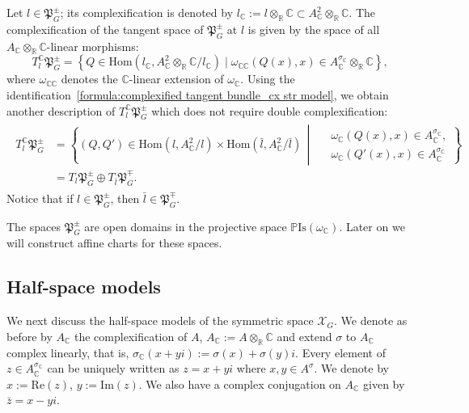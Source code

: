 \documentclass[oneside,11pt]{amsart}
\theoremstyle{definition}
\theoremstyle{remark}
\newcommand{\midwd}{\,\middle\vert\,}
\numberwithin{thm}{section}
\numberwithin{equation}{section}
\begin{document}
Let $l\in\mathfrak{P}_G^\pm$; its complexification is denoted by $l_\mathbb C:=l\otimes_\mathbb R\mathbb C\subset A_\mathbb C^2\otimes_\mathbb R \mathbb C$. The complexification of the tangent space of $\mathfrak P_G^\pm$ at $l$ is given by the space of all $A_\mathbb C\otimes_\mathbb R \mathbb C$-linear morphisms:
$$T_l^\mathbb C\mathfrak{P}_G^\pm=\left\{Q\in\mathrm{Hom}(l_\mathbb C,A_\mathbb C^2\otimes_\mathbb R\mathbb C/l_\mathbb C)\mid \omega_{\mathbb C\mathbb C}(Q(x),x)\in A^{\sigma_\mathbb C}_\mathbb C\otimes_\mathbb R\mathbb C\right\},$$
where $\omega_{\mathbb C\mathbb C}$ denotes the $\mathbb C$-linear extension of $\omega_\mathbb C$. Using the identification~\eqref{formula:complexified tangent bundle_cx str model}, we obtain another description of $T_l^\mathbb C\mathfrak{P}_G^\pm$ which does not require double complexification:
\begin{align}\label{eq:compl.tangent.P.Sp}
    \begin{aligned}
    T_l^\mathbb C\mathfrak{P}_G^\pm&=\left\{(Q,Q')\in\mathrm{Hom}(l,A_\mathbb C^2/l)\times \mathrm{Hom}(\bar l,A_\mathbb C^2/\bar l)\midwd
    \begin{aligned}
        &\ \omega_{\mathbb C}(Q(x),x)\in A^{\sigma_\mathbb C}_\mathbb C,\\
        &\ \omega_{\mathbb C}(Q'(x),x)\in A^{\sigma_\mathbb C}_\mathbb C
    \end{aligned}\right\}\\
    &=T_l\mathfrak{P}_G^\pm\oplus T_{\bar l}\mathfrak{P}_G^\mp. 
    \end{aligned}
\end{align}
Notice that if $l\in\mathfrak{P}_G^\pm$, then $\bar l\in\mathfrak{P}_G^\mp$.


The spaces $\mathfrak{P}_G^\pm$ are open domains in  the projective space $\mathbb{P}\mathrm{Is}(\omega_\mathbb C)$. Later on we will construct affine charts for these spaces. 

\subsection{Half-space models}\label{sec:upperhalf_real}

We next discuss the half-space models of the symmetric space $\mathcal X_{G}$. We denote as before by $A_\mathbb C$ the complexification of $A$, $A_\mathbb{C}:=A\otimes_\mathbb R\mathbb C$ and extend $\sigma$ to $A_\mathbb C$ complex linearly, that is, $\sigma_\mathbb C(x+yi):=\sigma(x)+\sigma(y)i$.
Every element of $z\in A_\mathbb{C}^{\sigma_\mathbb{C}}$ can be uniquely written as $z=x+yi$ where $x,y\in A^\sigma$. We denote by $x:=\mathrm{Re}(z)$, $y:=\mathrm{Im}(z)$. We also have a complex conjugation on $A_\mathbb{C}$ given by $\bar z=x-yi$.
\end{document}

